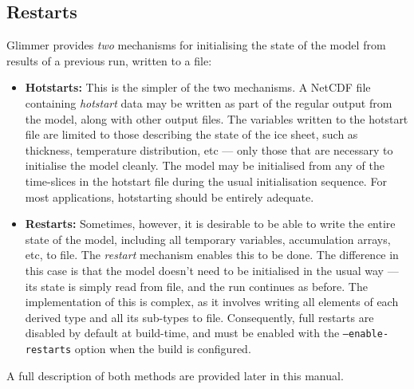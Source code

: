 \subsection{Restarts}\label{ug.sec.restarts}
%
Glimmer provides {\it two} mechanisms for initialising the state of
the model from results of a previous run, written to a file:
%
\begin{itemize}
\item {\bf Hotstarts:} This is the simpler of the two mechanisms. A
  NetCDF file containing \emph{hotstart} data may be written as part
  of the regular output from the model, along with other output
  files. The variables written to the hotstart file are limited to
  those describing the state of the ice sheet, such as thickness,
  temperature distribution, etc --- only those that are necessary to
  initialise the model cleanly. The model may be initialised from any
  of the time-slices in the hotstart file during the usual
  initialisation sequence. For most applications, hotstarting should
  be entirely adequate.
\item {\bf Restarts:} Sometimes, however, it is desirable to be able
  to write the entire state of the model, including all temporary
  variables, accumulation arrays, etc, to file. The \emph{restart}
  mechanism enables this to be done. The difference in this case is
  that the model doesn't need to be initialised in the usual way --- its
  state is simply read from file, and the run continues as before. The
  implementation of this is complex, as it involves writing all
  elements of each derived type and all its sub-types to
  file. Consequently, full restarts are disabled by default at
  build-time, and must be enabled with the \texttt{--enable-restarts}
  option when the build is configured.
\end{itemize}
%
A full description of both methods are provided later in this manual.

